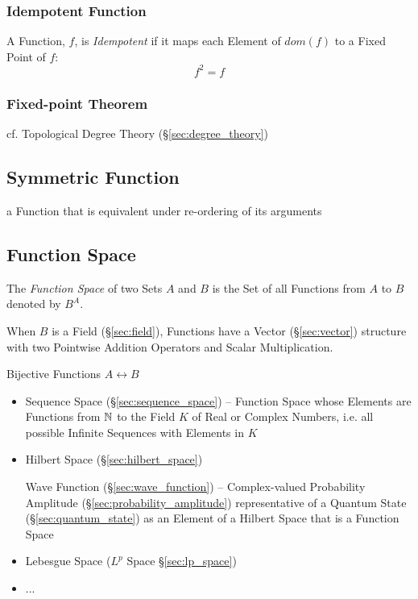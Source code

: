 \subsubsection{Idempotent Function}\label{sec:idempotent}

A Function, $f$, is \emph{Idempotent} if it maps each Element of
$dom(f)$ to a Fixed Point of $f$:
\[
  f^2 = f
\]



\subsubsection{Fixed-point Theorem}\label{sec:fixedpoint_theorem}

cf. Topological Degree Theory (\S\ref{sec:degree_theory})



\subsection{Symmetric Function}\label{sec:symmetric_function}

a Function that is equivalent under re-ordering of its arguments



\subsection{Function Space}\label{sec:function_space}

The \emph{Function Space} of two Sets $A$ and $B$ is the Set of all Functions
from $A$ to $B$ denoted by $B^A$.

When $B$ is a Field (\S\ref{sec:field}), Functions have a Vector
(\S\ref{sec:vector}) structure with two Pointwise Addition Operators and Scalar
Multiplication. %

Bijective Functions $A \leftrightarrow B$

\begin{itemize}
  \item Sequence Space (\S\ref{sec:sequence_space}) -- Function Space whose
    Elements are Functions from $\mathbb{N}$ to the Field $K$ of Real or Complex
    Numbers, i.e. all possible Infinite Sequences with Elements in $K$
  \item Hilbert Space (\S\ref{sec:hilbert_space})

    \fist Wave Function (\S\ref{sec:wave_function}) -- Complex-valued
    Probability Amplitude (\S\ref{sec:probability_amplitude}) representative of
    a Quantum State (\S\ref{sec:quantum_state}) as an Element of a Hilbert Space
    that is a Function Space
  \item Lebesgue Space ($L^p$ Space \S\ref{sec:lp_space})
  \item ...
\end{itemize}

